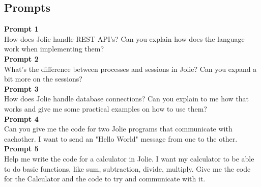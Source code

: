 \documentclass[12pt]{article}
\begin{document}
\subsection{Prompts}\label{prompts}
\textbf{Prompt 1}\\
How does Jolie handle REST API's? Can you explain how does the language work when implementing them?\vspace{14pt}\\
\textbf{Prompt 2}\\
What's the difference between processes and sessions in Jolie? Can you expand a bit more on the sessions?\vspace{14pt}\\
\textbf{Prompt 3}\\
How does Jolie handle database connections? Can you explain to me how that works and give me some practical examples on how to use them?\vspace{14pt}\\
\textbf{Prompt 4}\\
Can you give me the code for two Jolie programs that communicate with eachother. I want to send an "Hello World" message from one to the other.\vspace{14pt}\\
\textbf{Prompt 5}\\
Help me write the code for a calculator in Jolie. I want my calculator to be able to do basic functions, like sum, subtraction, divide, multiply. Give me the code for the Calculator and the code to try and communicate with it.
\end{document}
